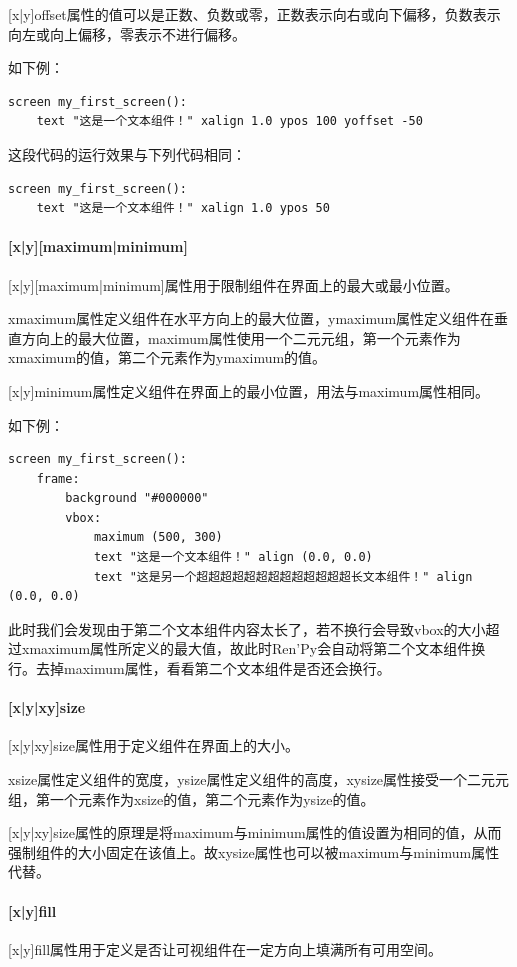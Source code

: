\documentclass[../../Main.tex]{subfiles}
\begin{document}
[x|y]offset属性的值可以是正数、负数或零，正数表示向右或向下偏移，负数表示向左或向上偏移，零表示不进行偏移。

如下例：
\begin{lstlisting}
screen my_first_screen():
    text "这是一个文本组件！" xalign 1.0 ypos 100 yoffset -50
\end{lstlisting}

这段代码的运行效果与下列代码相同：
\begin{lstlisting}
screen my_first_screen():
    text "这是一个文本组件！" xalign 1.0 ypos 50
\end{lstlisting}

\paragraph{[x|y][maximum|minimum]}
[x|y][maximum|minimum]属性用于限制组件在界面上的最大或最小位置。

xmaximum属性定义组件在水平方向上的最大位置，ymaximum属性定义组件在垂直方向上的最大位置，maximum属性使用一个二元元组，第一个元素作为xmaximum的值，第二个元素作为ymaximum的值。

[x|y]minimum属性定义组件在界面上的最小位置，用法与maximum属性相同。

如下例：
\begin{lstlisting}
screen my_first_screen():
    frame:
        background "#000000"
        vbox:
            maximum (500, 300)
            text "这是一个文本组件！" align (0.0, 0.0)
            text "这是另一个超超超超超超超超超超超超超长文本组件！" align (0.0, 0.0)
\end{lstlisting}

此时我们会发现由于第二个文本组件内容太长了，若不换行会导致vbox的大小超过xmaximum属性所定义的最大值，故此时Ren'Py会自动将第二个文本组件换行。去掉maximum属性，看看第二个文本组件是否还会换行。

\paragraph{[x|y|xy]size}
[x|y|xy]size属性用于定义组件在界面上的大小。

xsize属性定义组件的宽度，ysize属性定义组件的高度，xysize属性接受一个二元元组，第一个元素作为xsize的值，第二个元素作为ysize的值。

[x|y|xy]size属性的原理是将maximum与minimum属性的值设置为相同的值，从而强制组件的大小固定在该值上。故xysize属性也可以被maximum与minimum属性代替。

\paragraph{[x|y]fill}
[x|y]fill属性用于定义是否让可视组件在一定方向上填满所有可用空间。
\end{document}
